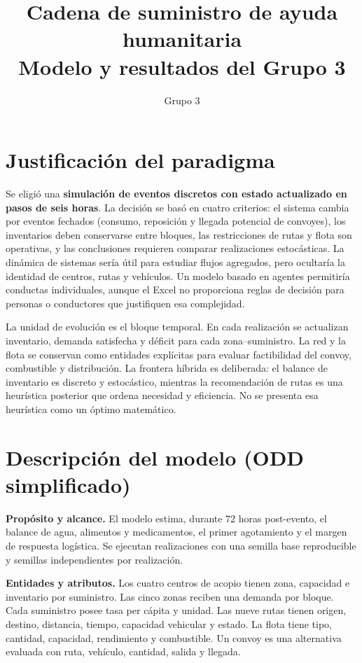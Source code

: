 \documentclass[11pt,letterpaper]{article}
\title{\vspace{-1.4cm}\textbf{Cadena de suministro de ayuda humanitaria}\\
\large Modelo y resultados del Grupo 3}
\author{Grupo 3}
\date{}
\begin{document}
\maketitle
\vspace{-1.2cm}

\section{Justificación del paradigma}

Se eligió una \textbf{simulación de eventos discretos con estado actualizado en
pasos de seis horas}. La decisión se basó en cuatro criterios: el sistema cambia
por eventos fechados (consumo, reposición y llegada potencial de convoyes), los
inventarios deben conservarse entre bloques, las restricciones de rutas y flota
son operativas, y las conclusiones requieren comparar realizaciones
estocásticas. La dinámica de sistemas sería útil para estudiar flujos agregados,
pero ocultaría la identidad de centros, rutas y vehículos. Un modelo basado en
agentes permitiría conductas individuales, aunque el Excel no proporciona reglas
de decisión para personas o conductores que justifiquen esa complejidad.

La unidad de evolución es el bloque temporal. En cada realización se actualizan
inventario, demanda satisfecha y déficit para cada zona--suministro. La red y la
flota se conservan como entidades explícitas para evaluar factibilidad del
convoy, combustible y distribución. La frontera híbrida es deliberada: el
balance de inventario es discreto y estocástico, mientras la recomendación de
rutas es una heurística posterior que ordena necesidad y eficiencia. No se
presenta esa heurística como un óptimo matemático.

\section{Descripción del modelo (ODD simplificado)}

\textbf{Propósito y alcance.} El modelo estima, durante 72 horas post-evento, el
balance de agua, alimentos y medicamentos, el primer agotamiento y el margen de
respuesta logística. Se ejecutan \NumeroRealizaciones{} realizaciones con una
semilla base reproducible y semillas independientes por realización.

\textbf{Entidades y atributos.} Los cuatro centros de acopio tienen zona,
capacidad e inventario por suministro. Las cinco zonas reciben una demanda por
bloque. Cada suministro posee tasa per cápita y unidad. Las nueve rutas tienen
origen, destino, distancia, tiempo, capacidad vehicular y estado. La flota tiene
tipo, cantidad, capacidad, rendimiento y combustible. Un convoy es una
alternativa evaluada con ruta, vehículo, cantidad, salida y llegada.
\end{document}
